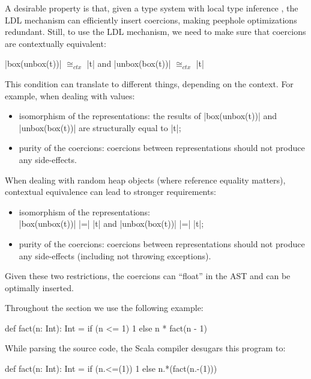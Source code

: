 A desirable property is that, given a type system with local type inference \cite{pierce-local-type-inference, odersky-colored-local-type-inf}, the LDL mechanism can efficiently insert coercions, making peephole optimizations redundant. Still, to use the LDL mechanism, we need to make sure that coercions are contextually equivalent:

\begin{center}
 |box(unbox(t))| $\cong_{ctx}$ |t| and |unbox(box(t))| $\cong_{ctx}$ |t|
\end{center}

This condition can translate to different things, depending on the context. For example, when dealing with values:

\begin{itemize}
\item isomorphism of the representations: the results of |box(unbox(t))| and |unbox(box(t))| are structurally equal to |t|;
\item purity of the coercions: coercions between representations should not produce any side-effects.
\end{itemize}

When dealing with random heap objects (where reference equality matters), contextual equivalence can lead to stronger requirements:

\begin{itemize}
\item isomorphism of the representations:\\ |box(unbox(t))| |=| |t| and |unbox(box(t))| |=| |t|;
\item purity of the coercions: coercions between representations should not produce any side-effects (including not throwing exceptions).
\end{itemize}

Given these two restrictions, the coercions can ``float'' in the AST and can be optimally inserted.



Throughout the section we use the following example:

\begin{lstlisting-nobreak}
 def fact(n: Int): Int =
   if (n <= 1)
     1
   else
     n * fact(n - 1)
\end{lstlisting-nobreak}

While parsing the source code, the Scala compiler desugars this program to:

\begin{lstlisting-nobreak}
 def fact(n: Int): Int =
   if (n.<=(1))
     1
   else
     n.*(fact(n.-(1)))
\end{lstlisting-nobreak}

